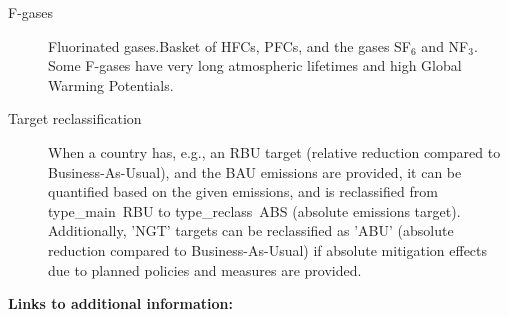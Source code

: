 \documentclass[12pt]{article}
\begin{document}
\begin{description}
 \item [F-gases] Fluorinated gases.Basket of HFCs, PFCs, and the gases SF$_6$ and NF$_3$. 
 Some F-gases have very long atmospheric lifetimes and high Global Warming Potentials.
 \item [Target reclassification] When a country has, e.g., an RBU target (relative reduction compared to Business-As-Usual), and the BAU emissions are provided, it can be quantified based on the given emissions, and is reclassified from type\_main~RBU to type\_reclass~ABS (absolute emissions target).
 Additionally, 'NGT' targets can be reclassified as 'ABU' (absolute reduction compared to Business-As-Usual) if absolute mitigation effects due to planned policies and measures are provided.
 \end{description}

 \noindent \textbf{Links to additional information:}
\end{document}
